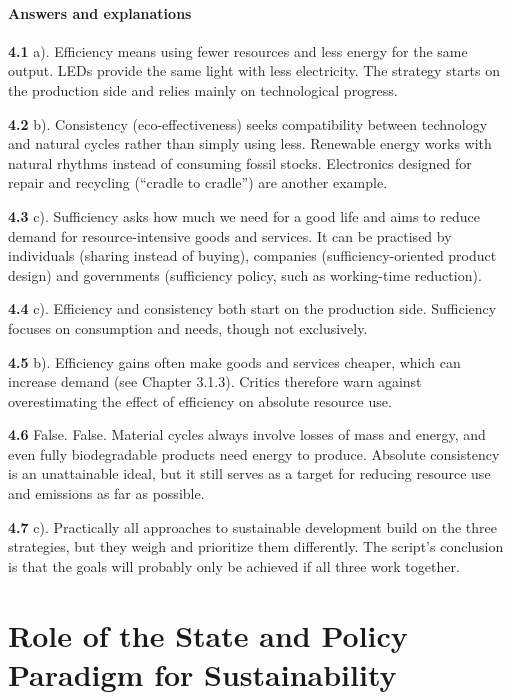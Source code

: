 \documentclass[
  british,
  a4paper,
  DIV=11,
  numbers=noendperiod,
  oneside,
  openany]{scrreprt}
\begin{document}
\subsubsection*{Answers and
explanations}\label{answers-and-explanations-3}

\textbf{4.1} a). Efficiency means using fewer resources and less energy
for the same output. LEDs provide the same light with less electricity.
The strategy starts on the production side and relies mainly on
technological progress.

\textbf{4.2} b). Consistency (eco-effectiveness) seeks compatibility
between technology and natural cycles rather than simply using less.
Renewable energy works with natural rhythms instead of consuming fossil
stocks. Electronics designed for repair and recycling (``cradle to
cradle'') are another example.

\textbf{4.3} c). Sufficiency asks how much we need for a good life and
aims to reduce demand for resource-intensive goods and services. It can
be practised by individuals (sharing instead of buying), companies
(sufficiency-oriented product design) and governments (sufficiency
policy, such as working-time reduction).

\textbf{4.4} c). Efficiency and consistency both start on the production
side. Sufficiency focuses on consumption and needs, though not
exclusively.

\textbf{4.5} b). Efficiency gains often make goods and services cheaper,
which can increase demand (see Chapter 3.1.3). Critics therefore warn
against overestimating the effect of efficiency on absolute resource
use.

\textbf{4.6} False. False. Material cycles always involve losses of mass
and energy, and even fully biodegradable products need energy to
produce. Absolute consistency is an unattainable ideal, but it still
serves as a target for reducing resource use and emissions as far as
possible.

\textbf{4.7} c). Practically all approaches to sustainable development
build on the three strategies, but they weigh and prioritize them
differently. The script's conclusion is that the goals will probably
only be achieved if all three work together.

\chapter{Role of the State and Policy Paradigm for
Sustainability}\label{role-of-the-state-and-policy-paradigm-for-sustainability}
\end{document}

